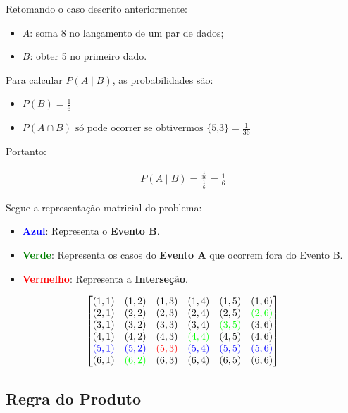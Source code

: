 \begin{exemplo}
Retomando o caso descrito anteriormente:
\begin{itemize}
	\item[] $A$: soma 8 no lançamento de um par de dados;
	\item[] $B$: obter 5 no primeiro dado.
\end{itemize}

Para calcular $P(A\mid B)$, as probabilidades são:
\begin{itemize}
	\item[] $P(B) = \frac{1}{6}$
	\item[] $P(A \cap  B) \text{ só pode ocorrer se obtivermos \{5,3\}}= \frac{1}{36}$
\end{itemize}

Portanto:

\begin{align*}
	P(A\mid B) = \frac{\frac{1}{36}}{\frac{1}{6}} = \frac{1}{6}
\end{align*}


Segue a representação matricial do problema: 
\begin{itemize}
	\item \textcolor{blue}{\textbf{Azul}}: Representa o \textbf{Evento B}.
	\item \textcolor{green}{\textbf{Verde}}: Representa os casos do \textbf{Evento A} que ocorrem fora do Evento B.
	\item \textcolor{red}{\textbf{Vermelho}}: Representa a \textbf{Interseção}.
\end{itemize}



$$\begin{bmatrix}
	(1,1) & (1,2) & (1,3) & (1,4) & (1,5) & (1,6) \\
	(2,1) & (2,2) & (2,3) & (2,4) & (2,5) & \color{green}{(2,6)} \\
	(3,1) & (3,2) & (3,3) & (3,4) & \color{green}{(3,5)} & (3,6) \\
	(4,1) & (4,2) & (4,3) & \color{green}{(4,4)} & (4,5) & (4,6) \\
	\color{blue}{(5,1)} & \color{blue}{(5,2)} & \color{red}{(5,3)} & \color{blue}{(5,4)} & \color{blue}{(5,5)} & \color{blue}{(5,6)} \\
	(6,1) & \color{green}{(6,2)} & (6,3) & (6,4) & (6,5) & (6,6)
\end{bmatrix}$$

\end{exemplo}

\subsection{Regra do Produto}


